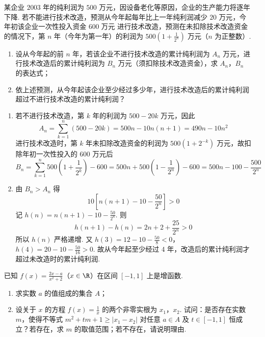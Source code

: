 \begin{problem}
某企业 \(2003\) 年的纯利润为 \(500\text{ 万元}\)，因设备老化等原因，企业的生产能力将逐年下降. 若不能进行技术改造，预测从今年起每年比上一年纯利润减少 \(20\text{ 万元}\)，今年初该企业一次性投入资金 \(600\text{ 万元}\) 进行技术改造，预测在未扣除技术改造资金的情况下，第 \(n\) 年（今年为第一年）的利润为 \(500\left(1+\frac{1}{2^n}\right)\text{ 万元}\)（\(n\) 为正整数）.

\begin{enumerate}
\item 设从今年起的前 \(n\) 年，若该企业不进行技术改造的累计纯利润为 \(A_n\text{ 万元}\)，进行技术改造后的累计纯利润为 \(B_n\text{ 万元}\)（须扣除技术改造资金），求 \(A_n\)，\(B_n\) 的表达式；
\item 依上述预测，从今年起该企业至少经过多少年，进行技术改造后的累计纯利润超过不进行技术改造的累计纯利润？
\end{enumerate}
\end{problem}

\begin{solution}
\begin{enumerate}
\item 若不进行技术改造，第 \(k\) 年的利润为 \(500-20k\) 万元，因此
\[
A_n=\sum_{k=1}^n(500-20k)=500n-10n(n+1)=490n-10n^2
\]
进行技术改造时，第 \(k\) 年未扣除改造资金的利润为 \(500(1+2^{-k})\) 万元，故扣除年初一次性投入的 \(600\) 万元后
\[
B_n=\sum_{k=1}^n500\left(1+\frac1{2^k}\right)-600
 =500n+500\left(1-\frac1{2^n}\right)-600
 =500n-100-\frac{500}{2^n}
\]

\item 由 \(B_n>A_n\) 得
\[
10\left[n(n+1)-10-\frac{50}{2^n}\right]>0
\]
记 \(h(n)=n(n+1)-10-\frac{50}{2^n}\).  则
\[
h(n+1)-h(n)=2n+2+\frac{25}{2^n}>0
\]
所以 \(h(n)\) 严格递增.  又
\(h(3)=12-10-\frac{50}{8}<0\)，\(h(4)=20-10-\frac{50}{16}>0\).
故从今年起至少经过 4 年，改造后的累计纯利润才超过未改造时的累计纯利润.
\end{enumerate}
\end{solution}

\begin{problem}
已知 \(f(x)=\frac{2x-a}{x^2+2}\)（\(x\in\R\)）在区间 \([-1,1]\) 上是增函数.

\begin{enumerate}
\item 求实数 \(a\) 的值组成的集合 \(A\)；
\item 设关于 \(x\) 的方程 \(f(x)=\frac{1}{x}\) 的两个非零实根为 \(x_1\)，\(x_2\). 试问：是否存在实数 \(m\)，使得不等式 \(m^2+tm+1\geqslant |x_1-x_2|\) 对任意 \(a\in A\) 及 \(t\in[-1,1]\) 恒成立？若存在，求 \(m\) 的取值范围；若不存在，请说明理由.
\end{enumerate}
\end{problem}

